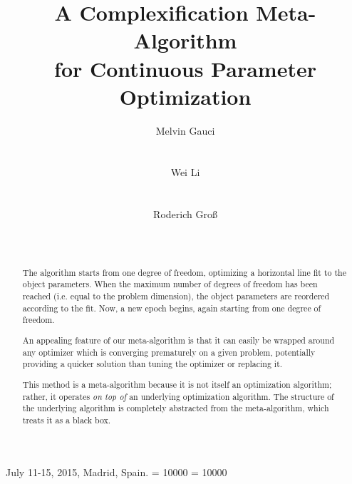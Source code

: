 \documentclass{sig-alternate}
\begin{document}
  {July 11-15, 2015, Madrid, Spain.}
 \clubpenalty = 10000
 \widowpenalty = 10000

\title{A Complexification Meta-Algorithm\\ for Continuous Parameter Optimization}

\author{
\alignauthor
Melvin Gauci\\
	\\
	\\
%
\alignauthor
Wei Li\\
	\\
	\\
%
\alignauthor
Roderich Gro{\ss}\\
	\\
	\\
}

\maketitle

\begin{abstract}

The algorithm starts from one degree of freedom, optimizing a horizontal line fit to the object parameters. When the maximum number of degrees of freedom has been reached (i.e. equal to the problem dimension), the object parameters are reordered according to the fit. Now, a new epoch begins, again starting from one degree of freedom.

An appealing feature of our meta-algorithm is that it can easily be wrapped around any optimizer which is converging prematurely on a given problem, potentially providing a quicker solution than tuning the optimizer or replacing it.

This method is a meta-algorithm because it is not itself an optimization algorithm; rather, it operates \emph{on top of} an underlying optimization algorithm. The structure of the underlying algorithm is completely abstracted from the meta-algorithm, which treats it as a black box.

\end{abstract}
\end{document}
